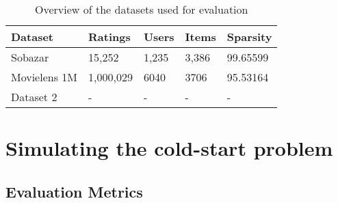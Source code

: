 

\begin{table}[H]
    \centering
    \begin{tabular}{|l|l|l|l|l|}
    \hline
	Dataset			& 	Ratings 	& 	Users	& 	Items 	& 	Sparsity 	\\ \hline
	Sobazar 		& 	15,252  	& 	1,235	&	3,386	&	99.65599	\\ \hline
	Movielens 1M	& 	1,000,029   &	6040 	&	3706	&	95.53164	\\ \hline
	Dataset 2 		& 	-  			& 	-		&	-		&	-			\\ \hline
    \end{tabular}
    \label{table:datasets}
    \caption [Overview of the datasets used for evaluation]{Overview of the datasets used for evaluation}
\end{table}


\section{Simulating the cold-start problem}



\subsection{Evaluation Metrics}



